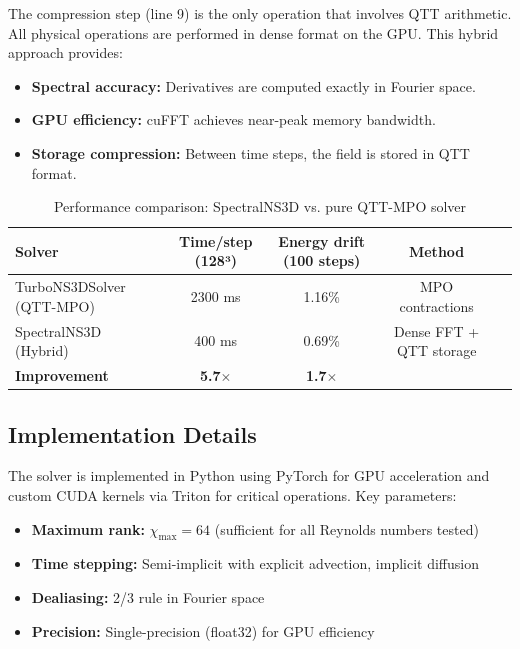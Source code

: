 \documentclass[11pt,a4paper]{article}
\theoremstyle{definition}
\begin{document}
The compression step (line 9) is the only operation that involves QTT arithmetic.
All physical operations are performed in dense format on the GPU.
This hybrid approach provides:

\begin{itemize}
    \item \textbf{Spectral accuracy:} Derivatives are computed exactly in Fourier space.
    \item \textbf{GPU efficiency:} cuFFT achieves near-peak memory bandwidth.
    \item \textbf{Storage compression:} Between time steps, the field is stored in QTT format.
\end{itemize}

\begin{table}[htbp]
\centering
\caption{Performance comparison: SpectralNS3D vs. pure QTT-MPO solver}
\label{tab:performance}
\begin{tabular}{lcccc}
\toprule
Solver & Time/step (128³) & Energy drift (100 steps) & Method \\
\midrule
TurboNS3DSolver (QTT-MPO) & 2300 ms & 1.16\% & MPO contractions \\
SpectralNS3D (Hybrid) & 400 ms & 0.69\% & Dense FFT + QTT storage \\
\midrule
\textbf{Improvement} & \textbf{5.7$\times$} & \textbf{1.7$\times$} & \\
\bottomrule
\end{tabular}
\end{table}

\subsection{Implementation Details}

The solver is implemented in Python using PyTorch for GPU acceleration and custom CUDA kernels via Triton for critical operations.
Key parameters:

\begin{itemize}
    \item \textbf{Maximum rank:} $\chi_{\max} = 64$ (sufficient for all Reynolds numbers tested)
    \item \textbf{Time stepping:} Semi-implicit with explicit advection, implicit diffusion
    \item \textbf{Dealiasing:} 2/3 rule in Fourier space
    \item \textbf{Precision:} Single-precision (float32) for GPU efficiency
\end{itemize}
\end{document}
